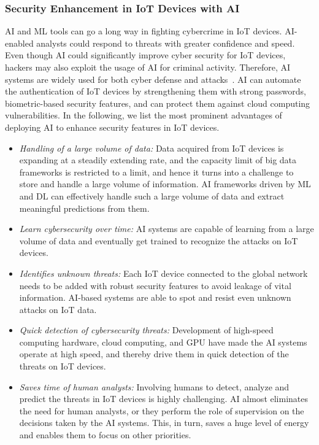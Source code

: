 \documentclass[journal]{IEEEtran}
\begin{document}
\subsubsection{Security Enhancement in IoT Devices with AI}
AI and ML tools can go a long way in fighting cybercrime in IoT devices. AI-enabled analysts could respond to threats with greater confidence and speed. Even though AI could significantly improve cyber security for IoT devices, hackers may also exploit the usage of AI for criminal activity. Therefore, AI systems are widely used for both cyber defense and attacks~\cite{rahouti2021incremental}. AI can automate the authentication of IoT devices by strengthening them with strong passwords, biometric-based security features, and can protect them against cloud computing vulnerabilities. In the following, we list the most prominent advantages of deploying AI to enhance security features in IoT devices.

\begin{itemize}
    \item \textit{Handling of a large volume of data:} Data acquired from IoT devices is expanding at a steadily extending rate, and the capacity limit of big data frameworks is restricted to a limit, and hence it turns into a challenge to store and handle a large volume of information. AI frameworks driven by ML and DL can effectively handle such a large volume of data and extract meaningful predictions from them.
   
    \item \textit{Learn cybersecurity over time:} AI systems are capable of learning from a large volume of data and eventually get trained to recognize the attacks on IoT devices.
   
    \item \textit{Identifies unknown threats:} Each IoT device connected to the global network needs to be added with robust security features to avoid leakage of vital information. AI-based systems are able to spot and resist even unknown attacks on IoT data. 
    
    \item \textit{Quick detection of cybersecurity threats:} Development of high-speed computing hardware, cloud computing, and GPU have made the AI systems operate at high speed, and thereby drive them in quick detection of the threats on IoT devices.
   
    \item \textit{Saves time of human analysts:} Involving humans to detect, analyze and predict the threats in IoT devices is highly challenging. AI almost eliminates the need for human analysts, or they perform the role of supervision on the decisions taken by the AI systems. This, in turn, saves a huge level of energy and enables them to focus on other priorities. 
\end{itemize}
\end{document}
